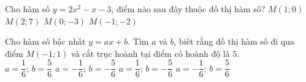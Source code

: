 \begin{ex}%
	Cho hàm  số $y=2 x^2-x-3$, điểm nào sau đây thuộc đồ thị hàm số?
	 \choice
		 {$M(1; 0)$}
		 {$M(2; 7)$}
		 {\True $M(0;-3)$}
		 {$M(-1;-2)$}
\end{ex}

\begin{ex}%
	Cho hàm số bậc nhất $y=ax+b$. Tìm $a$  và $b$, biết rằng đồ thị hàm số đi qua điểm $M(-1;1)$ và cắt trục hoành tại điểm có hoành độ là $5$.\\
	\choice 
		{$a=\dfrac{1}{6}$; $b=\dfrac{5}{6}$} 
		{$a=-\dfrac{1}{6}$; $b=-\dfrac{5}{6}$} 
		{$a=\dfrac{1}{6}$; $b=-\dfrac{5}{6}$} 
		{\True  $a=-\dfrac{1}{6}$; $b=\dfrac{5}{6}$}
\end{ex}

